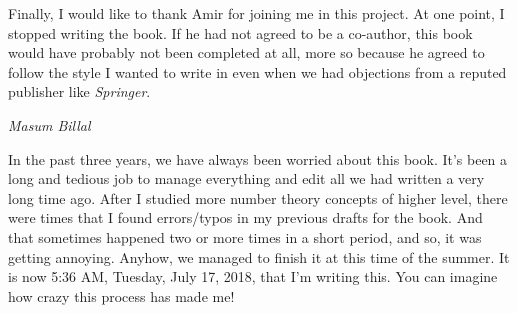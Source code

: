 \documentclass[leqno,14pt,DIV=calc,toc=index]{scrbook}
\begin{document}
Finally, I would like to thank Amir for joining me in this project. At one point, I stopped writing the book. If he had not agreed to be a co-author, this book would have probably not been completed at all, more so because he agreed to follow the style I wanted to write in even when we had objections from a reputed publisher like \textit{Springer}.

\begin{flushright}
	\itshape Masum Billal
\end{flushright}

\newpage

In the past three years, we have always been worried about this book. It's been a long and tedious job to manage everything and edit all we had written a very long time ago. After I studied more number theory concepts of higher level, there were times that I found errors/typos in my previous drafts for the book. And that sometimes happened two or more times in a short period, and so, it was getting annoying. Anyhow, we managed to finish it at this time of the summer. It is now 5:36 AM, Tuesday, July 17, 2018, that I'm writing this. You can imagine how crazy this process has made me!
\end{document}
